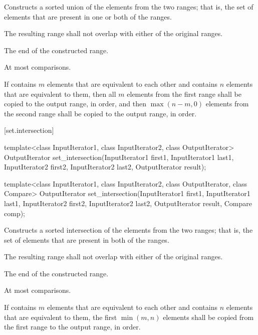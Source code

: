 \begin{itemdescr}
\pnum
\effects
Constructs a sorted union of the elements from the two ranges;
that is, the set of elements that are present in one or both of the ranges.

\pnum
\requires
The resulting range shall not overlap with either of the original ranges.

\pnum
\returns
The end of the constructed range.

\pnum
\complexity
At most
comparisons.

\pnum
\notes If  contains $m$ elements that are equivalent to
each other and  contains $n$ elements that are equivalent
to them, then all $m$ elements from the first range shall be copied to the output
range, in order, and then $\max(n - m, 0)$ elements from the second range shall
be copied to the output range, in order.
\end{itemdescr}

[set.intersection]{}

%
\begin{itemdecl}
template<class InputIterator1, class InputIterator2,
         class OutputIterator>
  OutputIterator
    set_intersection(InputIterator1 first1, InputIterator1 last1,
                     InputIterator2 first2, InputIterator2 last2,
                     OutputIterator result);

template<class InputIterator1, class InputIterator2,
         class OutputIterator, class Compare>
  OutputIterator
    set_intersection(InputIterator1 first1, InputIterator1 last1,
                     InputIterator2 first2, InputIterator2 last2,
                     OutputIterator result, Compare comp);
\end{itemdecl}

\begin{itemdescr}
\pnum
\effects
Constructs a sorted intersection of the elements from the two ranges;
that is, the set of elements that are present in both of the ranges.

\pnum
\requires
The resulting range shall not overlap with either of the original ranges.

\pnum
\returns
The end of the constructed range.

\pnum
\complexity
At most
comparisons.

\pnum
\notes If  contains $m$ elements that are equivalent to
each other and  contains $n$ elements that are equivalent
to them, the first $\min(m, n)$ elements shall be copied from the first range
to the output range, in order.
\end{itemdescr}

